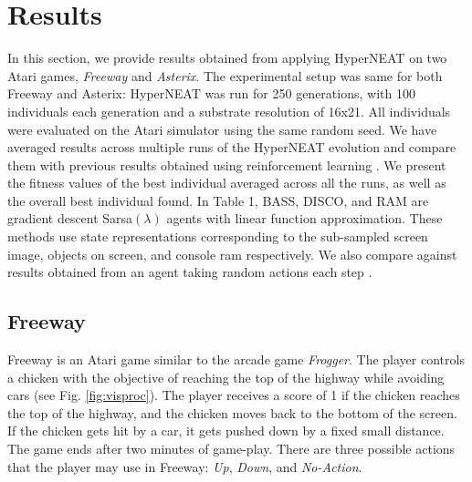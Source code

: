 \documentclass{acm_proc_article-sp}
\begin{document}
\section{Results}
\label{sec:results}
In this section, we provide results obtained from applying HyperNEAT on two Atari games, \textit{Freeway} and \textit{Asterix}. The experimental setup was same for both Freeway and Asterix: HyperNEAT was run for 250 generations, with 100 individuals each generation and a substrate resolution of 16x21. All individuals were evaluated on the Atari simulator using the same random seed. We have averaged results across multiple runs of the HyperNEAT evolution and compare them with previous results obtained using reinforcement learning \cite{naddaf10}. We present the fitness values of the best individual averaged across all the runs, as well as the overall best individual found. In Table 1, BASS, DISCO, and RAM are gradient descent Sarsa$(\lambda)$ agents with linear function approximation. These methods use state representations corresponding to the sub-sampled screen image, objects on screen, and console ram respectively. We also compare against results obtained from an agent taking random actions each step \cite{naddaf10}. 

\subsection {Freeway}

Freeway is an Atari game similar to the arcade game \textit{Frogger}. The player controls a chicken with the objective of reaching the top of the highway while avoiding cars (see Fig. \ref{fig:visproc}). The player receives a score of 1 if the chicken reaches the top of the highway, and the chicken moves back to the bottom of the screen. If the chicken gets hit by a car, it gets pushed down by a fixed small distance. The game ends after two minutes of game-play. There are three possible actions that the player may use in Freeway: \textit{Up}, \textit{Down}, and \textit{No-Action}.
\end{document}
